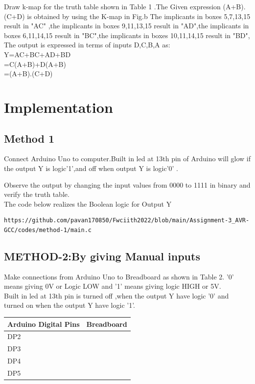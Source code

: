 \documentclass[10pt, a4paper]{article}
\begin{document}
Draw k-map for  the truth table shown in Table 1 .The Given expression  (A+B).(C+D) is obtained by  using the K-map in Fig.b 
The implicants in boxes 5,7,13,15 result in "AC" ,the implicants in boxes 9,11,13,15 result in "AD",the implicants in boxes 6,11,14,15 result in "BC",the implicants in boxes 10,11,14,15 result in "BD",
\\The output is expressed in terms of inputs D,C,B,A as: 
\\Y=AC+BC+AD+BD
\\ =C(A+B)+D(A+B)
\\ =(A+B).(C+D)

 \section{Implementation}
     \subsection{Method 1}
Connect Arduino Uno to  computer.Built in led at 13th pin of Arduino will glow if the  output Y is logic'1',and off when output Y is logic'0' .

Observe the output by changing the input values from 0000 to 1111 in binary and verify the truth table.
\\The code below realizes the Boolean logic for Output Y
\begin{lstlisting}
https://github.com/pavan170850/Fwciith2022/blob/main/Assignment-3_AVR-GCC/codes/method-1/main.c
\end{lstlisting}


\subsection{METHOD-2:By giving  Manual inputs}
Make connections from Arduino Uno to Breadboard as shown in Table 2.
'0' means giving  0V or Logic LOW and '1' means giving logic HIGH or 5V.
\\Built in led at 13th pin is turned off ,when  the output Y have logic '0' and turned on when the output Y have logic '1'.

  \begin{tabularx}{0.4\textwidth} { 
  | >{\centering\arraybackslash}X 
  | >{\centering\arraybackslash}X  | }
\hline
 \textbf{Arduino Digital Pins}& \textbf{Breadboard} \\
\hline
DP2 & 0 \\  
\hline
DP3 &0  \\ 
\hline
DP4 & 0 \\
\hline
DP5 & 0 \\
\hline
\end{tabularx}
\end{document}
